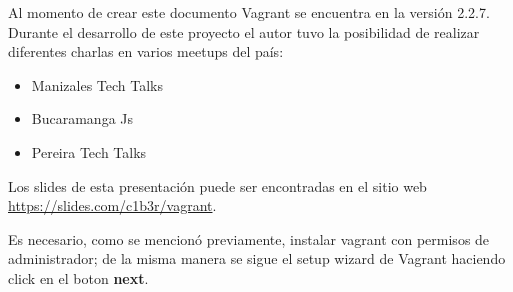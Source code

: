 \documentclass[letterpaper, 12pt, oneside]{article}
\begin{document}
    Al momento de crear este documento Vagrant se encuentra en la versión 2.2.7. Durante el desarrollo de este proyecto el autor tuvo la posibilidad de realizar diferentes charlas en varios meetups del país: 
    
    \begin{itemize}
        \item Manizales Tech Talks
        \item Bucaramanga Js
        \item Pereira Tech Talks
    \end{itemize}
    
    Los slides de esta presentación puede ser encontradas en el sitio web  \url{https://slides.com/c1b3r/vagrant}.
    
    Es necesario, como se mencionó previamente, instalar vagrant con permisos de administrador; de la misma manera se sigue el setup wizard de Vagrant haciendo click en el boton \textbf{next}.
\end{document}
